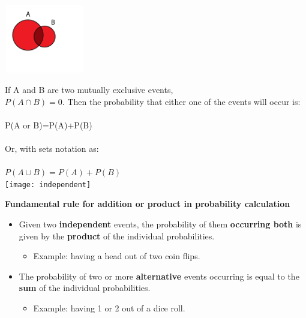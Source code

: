 \documentclass{article}
\begin{document}
\includegraphics[width=3.5cm, height=3cm]{union}

If A and B are two mutually exclusive events, \\ 
$P(A \cap B) = 0$. Then the probability that either one of the events will occur is: \\
\mbox{} \\
P(A or B)=P(A)+P(B) \\
\mbox{} \\
Or, with sets notation as: \\ 
\mbox{} \\
$P(A \cup B)=P(A) + P(B)$ \\ 

\texttt{[image: independent]}

\textbf{Fundamental rule for addition or product in probability calculation} \\

\begin{itemize}
    \item Given two \textbf{independent} events, the probability of them \textbf{occurring both} is given by the \textbf{product} of the individual probabilities. 
    \begin{itemize}
        \item Example: having a head out of two coin flips.
    \end{itemize}
    \item The probability of two or more \textbf{alternative} events occurring is equal to the \textbf{sum} of the individual probabilities. 
    \begin{itemize}
        \item Example: having 1 or 2 out of a dice roll.
    \end{itemize}
\end{itemize}
\end{document}
